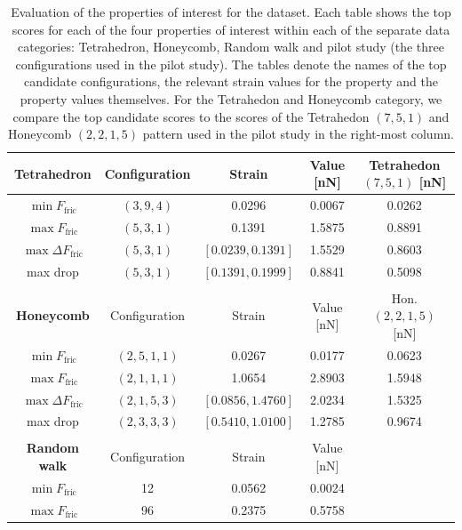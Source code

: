 \begin{table}[!htb]
  \begin{center}
  \caption{Evaluation of the properties of interest for the dataset. Each table shows the top scores for each of the four properties of interest within each of the separate data categories: Tetrahedron, Honeycomb, Random walk and pilot study (the three configurations used in the pilot study). The tables denote the names of the top candidate configurations, the relevant strain values for the property and the property values themselves. For the Tetrahedon and Honeycomb category, we compare the top candidate scores to the scores of the Tetrahedon $(7,5,1)$ and Honeycomb $(2,2,1,5)$ pattern used in the pilot study in the right-most column. }
  \label{tab:data_properties}
  \begin{tabular}{| c | c | c | c | c |} \hline
  \textbf{Tetrahedron} & Configuration & Strain & Value [nN] & Tetrahedon $(7,5,1)$ [nN]  \\ \hline
  $\min F_{\text{fric}}$ & $(3,9,4)$ &  0.0296 & 0.0067 & 0.0262 \\ \hline
  $\max F_{\text{fric}}$ & $(5,3,1)$ & 0.1391 & 1.5875 & 0.8891 \\ \hline
  $\max \Delta F_{\text{fric}}$  & $(5, 3, 1)$ & $[0.0239, 0.1391]$ & 1.5529 & 0.8603  \\ \hline
  max drop & $(5,3,1)$ & $[0.1391, 0.1999]$ & 0.8841 & 0.5098 \\ \hline
  \multicolumn{5}{c}{} \\ \hline
  \textbf{Honeycomb} & Configuration & Strain & Value [nN]  & Hon. $(2,2,1,5)$ [nN]  \\ \hline
  $\min F_{\text{fric}}$ & $(2, 5, 1, 1)$ &  0.0267 & 0.0177 & 0.0623 \\ \hline
  $\max F_{\text{fric}}$ & $(2, 1, 1, 1)$ & 1.0654 & 2.8903 & 1.5948 \\ \hline
  $\max \Delta F_{\text{fric}}$  & $(2, 1, 5, 3)$ & $[0.0856, 1.4760]$ & 2.0234 & 1.5325 \\ \hline
  max drop & $(2, 3, 3, 3)$ & $[0.5410, 1.0100]$ & 1.2785 & 0.9674\\ \hline
  \multicolumn{5}{c}{} \\ \cline{1-4}
  \textbf{Random walk} & Configuration & Strain & Value [nN] & \multicolumn{1}{c}{} \\ \cline{1-4}
  $\min F_{\text{fric}}$ & 12 &  0.0562 & 0.0024& \multicolumn{1}{c}{} \\ \cline{1-4}
  $\max F_{\text{fric}}$ & 96 & 0.2375 & 0.5758 & \multicolumn{1}{c}{} \\ \cline{1-4}

\end{tabular}
\end{center}
\end{table}
